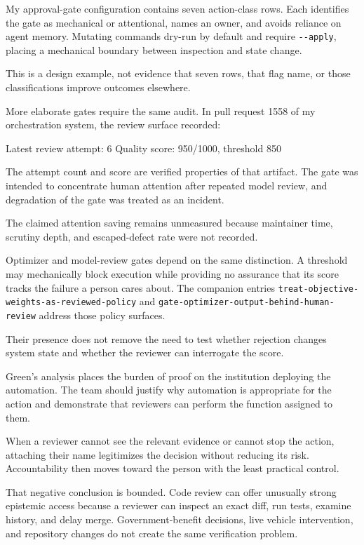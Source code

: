 My approval-gate configuration contains seven action-class rows. Each identifies the gate as mechanical or attentional, names an owner, and avoids reliance on agent memory. Mutating commands dry-run by default and require \texttt{-\/-apply}, placing a mechanical boundary between inspection and state change.

This is a design example, not evidence that seven rows, that flag name, or those classifications improve outcomes elsewhere.

More elaborate gates require the same audit. In pull request 1558 of my orchestration system, the review surface recorded:

\begin{record}
\begin{recordbody}
Latest review attempt: 6
Quality score: 950/1000, threshold 850
\end{recordbody}
\end{record}

The attempt count and score are verified properties of that artifact. The gate was intended to concentrate human attention after repeated model review, and degradation of the gate was treated as an incident.

The claimed attention saving remains unmeasured because maintainer time, scrutiny depth, and escaped-defect rate were not recorded.

Optimizer and model-review gates depend on the same distinction. A threshold may mechanically block execution while providing no assurance that its score tracks the failure a person cares about. The companion entries \texttt{treat-objective-weights-as-reviewed-policy} and \texttt{gate-optimizer-output-behind-human-review} address those policy surfaces.

Their presence does not remove the need to test whether rejection changes system state and whether the reviewer can interrogate the score.

Green's analysis places the burden of proof on the institution deploying the automation. The team should justify why automation is appropriate for the action and demonstrate that reviewers can perform the function assigned to them.

When a reviewer cannot see the relevant evidence or cannot stop the action, attaching their name legitimizes the decision without reducing its risk. Accountability then moves toward the person with the least practical control.

That negative conclusion is bounded. Code review can offer unusually strong epistemic access because a reviewer can inspect an exact diff, run tests, examine history, and delay merge. Government-benefit decisions, live vehicle intervention, and repository changes do not create the same verification problem.

